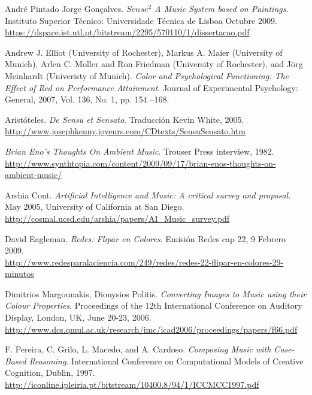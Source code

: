 \begin{thebibliography}{9}

  André Pintado Jorge Gonçalves. \emph{$Sense^{2}$ A Music System based on Paintings}. Instituto Superior Técnico: Universidade Técnica de Lisboa Octubre 2009.\\
 \url{https://dspace.ist.utl.pt/bitstream/2295/570110/1/dissertacao.pdf}
 
  Andrew J. Elliot (University of Rochester), Markus A. Maier (University of Munich), Arlen C. Moller and Ron Friedman (University of Rochester), and Jörg Meinhardt (Univeristy of Munich). \emph{Color and Psychological Functioning: The Effect of Red on Performance Attainment}. Journal of Experimental Psychology: General, 2007, Vol. 136, No. 1, pp. 154 –168.

 Aristóteles. \emph{De Sensu et Sensato}. Traducción Kevin White, 2005.\\ 
 \url{http://www.josephkenny.joyeurs.com/CDtexts/SensuSensato.htm}

 \emph{Brian Eno's Thoughts On Ambient Music}. Trouser Press interview, 1982. \\
 \url{http://www.synthtopia.com/content/2009/09/17/brian-enos-thoughts-on-ambient-music/}

 Arshia Cont. \emph{Artificial Intelligence and Music: A critical survey and proposal}. May 2005, University of California at San Diego.\\
 \url{http://cosmal.ucsd.edu/arshia/papers/AI_Music_survey.pdf}

 David Eagleman. \emph{Redes: Flipar en Colores}. Emisión Redes cap 22, 9 Febrero 2009.\\
 \url{http://www.redesparalaciencia.com/249/redes/redes-22-flipar-en-colores-29-minutos}

 Dimitrios Margounakis, Dionysios Politis. \emph{Converting Images to Music using their Colour Properties}. Proceedings of the 12th International Conference on Auditory Display, London, UK, June 20-23, 2006.\\
 \url{http://www.dcs.qmul.ac.uk/research/imc/icad2006/proceedings/papers/f66.pdf}

 F. Pereira, C. Grilo, L. Macedo, and A. Cardoso. \emph{Composing Music with Case-Based Reasoning}. International Conference on Computational Models of Creative Cognition, Dublin, 1997.\\
 \url{http://iconline.ipleiria.pt/bitstream/10400.8/94/1/ICCMCC1997.pdf}


\end{thebibliography}
